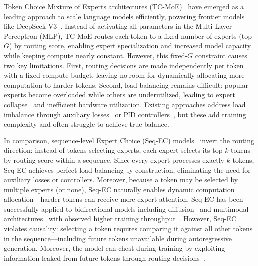 \documentclass{article}
\theoremstyle{plain}
\theoremstyle{definition}
\theoremstyle{remark}
\begin{document}
Token Choice Mixture of Experts architectures (TC-MoE)~\cite{shazeer2017outrageously, lepikhin2021gshard, fedus2022switch} have emerged as a leading approach to scale language models efficiently, powering frontier models like DeepSeek-V3~\cite{deepseekv3}. Instead of activating all parameters in the Multi Layer Perceptron (MLP), TC-MoE routes each token to a fixed number of experts (top-$G$) by routing score, enabling expert specialization and increased model capacity while keeping compute nearly constant. However, this fixed-$G$ constraint causes two key limitations. First, routing decisions are made independently per token with a fixed compute budget, leaving no room for dynamically allocating more computation to harder tokens. Second, load balancing remains difficult: popular experts become overloaded while others are underutilized, leading to expert collapse~\cite{chi2022representation} and inefficient hardware utilization. Existing approaches address load imbalance through auxiliary losses~\cite{fedus2022switch, zoph2022stmoe} or PID controllers~\cite{longcat2025, wang2024auxiliarylossfreeloadbalancingstrategy}, but these add training complexity and often struggle to achieve true balance.

In comparison, sequence-level Expert Choice (Seq-EC) models~\cite{zhou2022mixture} invert the routing direction: instead of tokens selecting experts, each expert selects its top-$k$ tokens by routing score within a sequence. Since every expert processes exactly $k$ tokens, Seq-EC achieves perfect load balancing by construction, eliminating the need for auxiliary losses or controllers. Moreover, because a token may be selected by multiple experts (or none), Seq-EC naturally enables dynamic computation allocation—harder tokens can receive more expert attention. Seq-EC has been successfully applied to bidirectional models including diffusion~\cite{sun2024ecdit, shi2025diffmoe} and multimodal architectures~\cite{lin2024moma, zong2024mova} with observed higher training throughput~\cite{muennighoff2024olmoe}. However, Seq-EC violates causality: selecting a token requires comparing it against all other tokens in the sequence—including future tokens unavailable during autoregressive generation. 
Moreover, the model can cheat during training by exploiting information leaked from future tokens through routing decisions~\cite{wang2024auxiliarylossfreeloadbalancingstrategy}.
\end{document}
